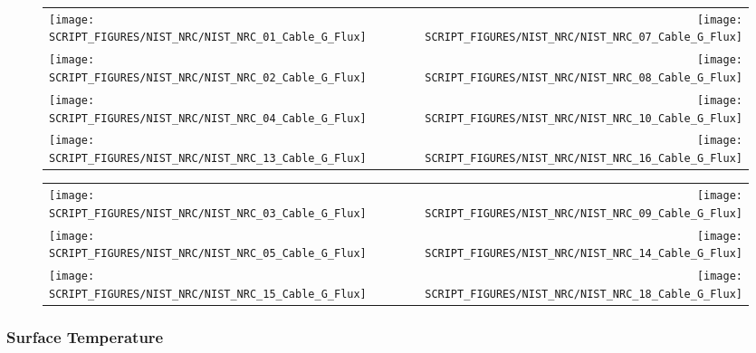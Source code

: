 \begin{figure}[!ht]
\begin{tabular*}{\textwidth}{l@{\extracolsep{\fill}}r}
\texttt{[image: SCRIPT\_FIGURES/NIST\_NRC/NIST\_NRC\_01\_Cable\_G\_Flux]} &
\texttt{[image: SCRIPT\_FIGURES/NIST\_NRC/NIST\_NRC\_07\_Cable\_G\_Flux]} \\
\texttt{[image: SCRIPT\_FIGURES/NIST\_NRC/NIST\_NRC\_02\_Cable\_G\_Flux]} &
\texttt{[image: SCRIPT\_FIGURES/NIST\_NRC/NIST\_NRC\_08\_Cable\_G\_Flux]} \\
\texttt{[image: SCRIPT\_FIGURES/NIST\_NRC/NIST\_NRC\_04\_Cable\_G\_Flux]} &
\texttt{[image: SCRIPT\_FIGURES/NIST\_NRC/NIST\_NRC\_10\_Cable\_G\_Flux]} \\
\texttt{[image: SCRIPT\_FIGURES/NIST\_NRC/NIST\_NRC\_13\_Cable\_G\_Flux]} &
\texttt{[image: SCRIPT\_FIGURES/NIST\_NRC/NIST\_NRC\_16\_Cable\_G\_Flux]}
\end{tabular*}
\label{NIST_NRC_Cable_G_Flux_Closed}
\end{figure}

\begin{figure}[!ht]
\begin{tabular*}{\textwidth}{l@{\extracolsep{\fill}}r}
\texttt{[image: SCRIPT\_FIGURES/NIST\_NRC/NIST\_NRC\_03\_Cable\_G\_Flux]} &
\texttt{[image: SCRIPT\_FIGURES/NIST\_NRC/NIST\_NRC\_09\_Cable\_G\_Flux]} \\
\texttt{[image: SCRIPT\_FIGURES/NIST\_NRC/NIST\_NRC\_05\_Cable\_G\_Flux]} &
\texttt{[image: SCRIPT\_FIGURES/NIST\_NRC/NIST\_NRC\_14\_Cable\_G\_Flux]} \\
\texttt{[image: SCRIPT\_FIGURES/NIST\_NRC/NIST\_NRC\_15\_Cable\_G\_Flux]} &
\texttt{[image: SCRIPT\_FIGURES/NIST\_NRC/NIST\_NRC\_18\_Cable\_G\_Flux]}
\end{tabular*}
\label{NIST_NRC_Cable_G_Flux_Open}
\end{figure}

\clearpage

\subsubsection{Surface Temperature}

